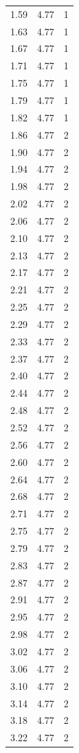 \begin{longtable}{lrr}
  1.59 & 4.77 & 1 \\
  1.63 & 4.77 & 1 \\
  1.67 & 4.77 & 1 \\
  1.71 & 4.77 & 1 \\
  1.75 & 4.77 & 1 \\
  1.79 & 4.77 & 1 \\
  1.82 & 4.77 & 1 \\
  1.86 & 4.77 & 2 \\
  1.90 & 4.77 & 2 \\
  1.94 & 4.77 & 2 \\
  1.98 & 4.77 & 2 \\
  2.02 & 4.77 & 2 \\
  2.06 & 4.77 & 2 \\
  2.10 & 4.77 & 2 \\
  2.13 & 4.77 & 2 \\
  2.17 & 4.77 & 2 \\
  2.21 & 4.77 & 2 \\
  2.25 & 4.77 & 2 \\
  2.29 & 4.77 & 2 \\
  2.33 & 4.77 & 2 \\
  2.37 & 4.77 & 2 \\
  2.40 & 4.77 & 2 \\
  2.44 & 4.77 & 2 \\
  2.48 & 4.77 & 2 \\
  2.52 & 4.77 & 2 \\
  2.56 & 4.77 & 2 \\
  2.60 & 4.77 & 2 \\
  2.64 & 4.77 & 2 \\
  2.68 & 4.77 & 2 \\
  2.71 & 4.77 & 2 \\
  2.75 & 4.77 & 2 \\
  2.79 & 4.77 & 2 \\
  2.83 & 4.77 & 2 \\
  2.87 & 4.77 & 2 \\
  2.91 & 4.77 & 2 \\
  2.95 & 4.77 & 2 \\
  2.98 & 4.77 & 2 \\
  3.02 & 4.77 & 2 \\
  3.06 & 4.77 & 2 \\
  3.10 & 4.77 & 2 \\
  3.14 & 4.77 & 2 \\
  3.18 & 4.77 & 2 \\
  3.22 & 4.77 & 2 \\

\end{longtable}
